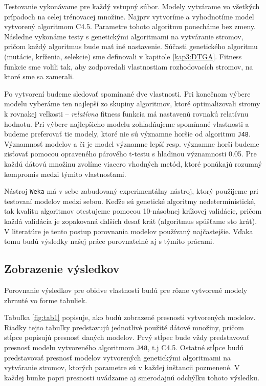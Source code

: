 Testovanie vykonávame pre každý vstupný súbor. Modely vytvárame vo všetkých prípadoch na celej trénovacej množine. Najprv vytvoríme a vyhodnotíme model vytvorený algoritmom C4.5. Parametre tohoto algoritmu ponecháme bez zmeny. Následne vykonáme testy s genetickými algoritmami na vytváranie stromov, pričom každý algoritmus bude mať iné nastavenie. Súčasti genetického algoritmu (mutácie, kríženia, selekcie) sme definovali v kapitole \ref{kap3:DTGA}. Fitness funkcie sme volili tak, aby zodpovedali vlastnostiam rozhodovacích stromov, na ktoré sme sa zamerali.

Po vytvorení budeme sledovať spomínané dve vlastnosti. Pri konečnom výbere modelu vyberáme ten najlepší zo skupiny algoritmov, ktoré optimalizovali stromy k rovnakej veľkosti -- \emph{relatívna} fitness funkcia má nastavenú rovnakú relatívnu hodnotu. Pri výbere najlepšieho modelu zohľadňujeme spomínané vlastnosti a budeme preferovať tie modely, ktoré nie sú významne horšie od algoritmu \verb|J48|. Významnosť modelov a či je model významne lepší resp. významne horší budeme zisťovať pomocou opraveného párového t-testu s hladinou významnosti 0.05. Pre každú dátovú množinu zvolíme viacero vhodných metód, ktoré ponúkajú rozumný kompromis medzi týmito vlastnosťami.

Nástroj \verb|Weka| má v sebe zabudovaný experimentálny nástroj, ktorý použijeme pri testovaní modelov medzi sebou. Keďže sú genetické algoritmy nedeterministické, tak kvalitu algoritmov otestujeme pomocou 10-násobnej krížovej validácie, pričom každá validácia je zopakovaná ďalších desať krát (algoritmus spúšťame sto krát). V literatúre je tento postup porovnania modelov používaný najčastejšie. Vďaka tomu budú výsledky našej práce porovnateľné aj s týmito prácami.

\subsection{Zobrazenie výsledkov}
Porovnanie výsledkov pre obidve vlastnosti budú pre rôzne vytvorené modely zhrnuté vo forme tabuliek.

Tabuľka \ref{fig:tab1} popisuje, ako budú zobrazené presnosti vytvorených modelov. Riadky tejto tabuľky predstavujú jednotlivé použité dátové množiny, pričom stĺpce popisujú presnosť daných modelov. Prvý stĺpec bude vždy predstavovať presnosť modelu vytvoreného algoritmom \verb|J48|, t.j C4.5. Ostatné stĺpce budú predstavovať presnosť modelov vytvorených genetickými algoritmami na vytváranie stromov, ktorých parametre sú v každej inštancii pozmenené. V každej bunke popri presnosti uvádzame  aj smerodajnú odchýlku tohoto výsledku.

